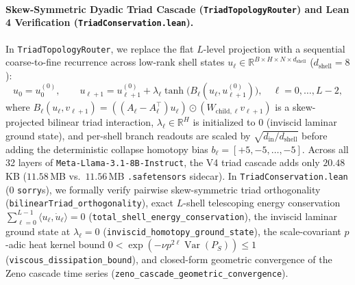 \documentclass[11pt,a4paper]{article}
\begin{document}
\paragraph{Skew-Symmetric Dyadic Triad Cascade (\texttt{TriadTopologyRouter}) and Lean 4 Verification (\texttt{TriadConservation.lean}).}
In \texttt{TriadTopologyRouter}, we replace the flat $L$-level projection with a sequential coarse-to-fine recurrence across low-rank shell states $u_\ell \in \mathbb{R}^{B \times H \times N \times d_{\text{shell}}}$ ($d_{\text{shell}} = 8$):
\begin{equation}
    u_0 = u_0^{(0)}, \qquad u_{\ell+1} = u_{\ell+1}^{(0)} + \lambda_\ell \tanh\!\big(B_\ell(u_\ell, u_{\ell+1}^{(0)})\big), \quad \ell = 0, \dots, L-2,
\end{equation}
where $B_\ell(u_\ell, v_{\ell+1}) = ((A_\ell - A_\ell^\top) u_\ell) \odot (W_{\text{child},\ell} v_{\ell+1})$ is a skew-projected bilinear triad interaction, $\lambda_\ell \in \mathbb{R}^H$ is initialized to $0$ (inviscid laminar ground state), and per-shell branch readouts are scaled by $\sqrt{d_{\text{in}} / d_{\text{shell}}}$ before adding the deterministic collapse homotopy bias $b_\ell = [+5, -5, \dots, -5]$. Across all 32 layers of \texttt{Meta-Llama-3.1-8B-Instruct}, the V4 triad cascade adds only $20.48$\,KB ($11.58$\,MB vs.\ $11.56$\,MB \texttt{.safetensors} sidecar). In \texttt{TriadConservation.lean} (0 \texttt{sorry}s), we formally verify pairwise skew-symmetric triad orthogonality (\texttt{bilinearTriad\_orthogonality}), exact $L$-shell telescoping energy conservation $\sum_{\ell=0}^{L-1} \langle u_\ell, \dot{u}_\ell \rangle = 0$ (\texttt{total\_shell\_energy\_conservation}), the inviscid laminar ground state at $\lambda_\ell = 0$ (\texttt{inviscid\_homotopy\_ground\_state}), the scale-covariant $p$-adic heat kernel bound $0 < \exp(-\nu p^{2\ell} \operatorname{Var}(P_S)) \le 1$ (\texttt{viscous\_dissipation\_bound}), and closed-form geometric convergence of the Zeno cascade time series (\texttt{zeno\_cascade\_geometric\_convergence}).
\end{document}

